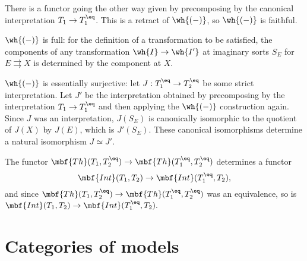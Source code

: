 \documentclass[11pt]{article}
\begin{document}
There is a functor going the other way given by precomposing by the canonical interpretation $T_1 \to T_1^{\eq}$. This is a retract of $\wh{(-)}$, so $\wh{(-)}$ is faithful.

$\wh{(-)}$ is full: for the definition of a transformation to be satisfied, the components of any transformation $\wh{I} \to \wh{I'}$ at imaginary sorts $S_E$ for $E \rightrightarrows X$ is determined by the component at $X$.

$\wh{(-)}$ is essentially surjective: let $J : T_1^{\eq} \to T_2^{\eq}$ be some strict interpretation. Let $J'$ be the interpretation obtained by precomposing by the interpretation $T_1 \to T_1^{\eq}$ and then applying the $\wh{(-)}$ construction again. Since $J$ was an interpretation, $J(S_E)$ is canonically isomorphic to the quotient of $J(X)$ by $J(E)$, which is $J'(S_E)$. These canonical isomorphisms determine a natural isomorphism $J \simeq J'$.

The functor $\mbf{Th}(T_1, T_2^{\eq}) \to \mbf{Th}(T_1^{\eq}, T_2^{\eq})$ determines a functor
$$
\mbf{Int}(T_1, T_2) \to \mbf{Int}(T_1^{\eq}, T_2),
$$
and since $\mbf{Th}(T_1, T_2^{\eq}) \to \mbf{Th}(T_1^{\eq}, T_2^{\eq})$ was an equivalence, so is $\mbf{Int}(T_1, T_2) \to \mbf{Int}(T_1^{\eq}, T_2).$




\section{Categories of models}

\end{document}
